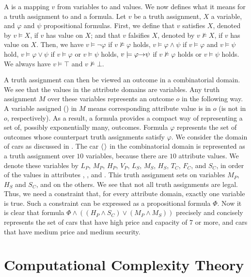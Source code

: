 A  is a mapping $v$ from variables to 
and  values.
We now defines what it means for a truth assignment to  
and  a formula.
Let $v$ be a truth assignment, $X$ a variable, and $\varphi$ and $\psi$
propositional formulas.
First, we define that $v$ satisfies $X$, denoted by $v \models X$,
if $v$ has value  on $X$; and that $v$ falsifies $X$, denoted 
by $v \not\models X$, if $v$ has value  on $X$.
Then, we have $v \models \neg \varphi$
if  $v \not\models \varphi$ holds, $v \models \varphi \land \psi$
if $v \models \varphi$ and $v \models \psi$ hold, $v \models \varphi \lor \psi$
if $v \models \varphi$ or $v \models \psi$ holds, $v \models \varphi \mathit{\rightarrow} \psi$
if $v \not\models \varphi$ holds or $v \models \psi$ holds.
We always have $v \models \top$ and $v \not\models \bot$.

A truth assignment can then be viewed an outcome in a combinatorial domain.
We see that the values in the attribute domains are variables.
Any truth assignment $M$ over these variables represents an outcome $o$
in the following way.
A variable assigned  () in $M$ means corresponding 
attribute value is in $o$ (is not in $o$, respectively).
As a result, a formula provides a compact way of representing a set of, 
possibly exponentially many, outcomes.
Formula $\varphi$ represents the set of outcomes whose counterpart
truth assignments satisfy $\varphi$.
We consider the domain of cars as discussed in .
The car $\mathit{\langle}$$\mathit{\rangle}$ in the combinatorial domain
is represented as a truth assignment over $10$ variables, because
there are $10$ attribute values.
We denote these variables by $L_P$, $M_P$, $H_P$, $V_P$,
$L_S$, $M_S$, $H_S$, $T_C$, $F_C$, and $S_C$, in order of the
values in attributes , , and .
This truth assignment sets  on variables $M_P$,
$H_S$ and $S_C$, and  on the others.
We see that not all truth assignments are legal.
Thus, we need a constraint that, for every attribute domain,
exactly one variable is true.  Such a constraint can be
expressed as a propositional formula $\Phi$.
Now it is clear that formula $\Phi \land ((H_P \land S_C) \lor (M_P \land M_S))$ precisely
and concisely represents the set of cars that have high price and
capacity of 7 or more, and cars that have medium price and medium
security.


\section{Computational Complexity Theory \label{sec:comp_theory}}

